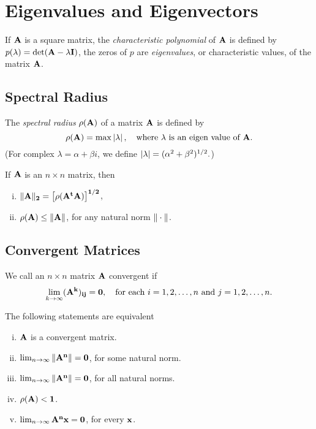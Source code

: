 \section{Eigenvalues and Eigenvectors}
If $\bf A$ is a square matrix, the \emph{characteristic polynomial} of $\bf A$ is defined by $p(\lambda)=\det(\bf A-\lambda I)$, the zeros of $p$ are \emph{eigenvalues}, or characteristic values, of the matrix $\bf A$.

\subsection{Spectral Radius}
\begin{defn}
The \emph{spectral radius} $\rho(\bf A)$ of a matrix $\bf A$ is defined by
\[
\rho(\bf A)=\max\left|\lambda\right|,\quad\text{where $\lambda$ is an eigen value of $\bf A$.}
\]
(For complex $\lambda=\alpha+\beta i$, we define $\left|\lambda\right|=(\alpha^2+\beta^2)^{1/2}.$)
\end{defn}

\begin{theo}
If $\bf A$ is an $n\times n$ matrix, then
\begin{enumerate}[(i)]
    \item $\|\bf A\|_2=\left[\rho(A^tA)\right]^{1/2}$,
    \item $\rho(\bf A)\leq\|\bf A\|$, for any natural norm $\|\cdot\|$.
\end{enumerate}
\end{theo}

\subsection{Convergent Matrices}
\begin{defn}[Convergent]
We call an $n\times n$ matrix $\bf A$  convergent if
\[
\lim_{k\to\infty}(\bf A^k)_{ij}=0,\quad\text{for each $i=1,2,\ldots,n$ and $j=1,2,\ldots,n$.}
\]
\end{defn}

\begin{theo}
The following statements are equivalent
\begin{enumerate}[(i)]
    \item $\bf A$ is a convergent matrix.
    \item $\lim_{n\to\infty}\|\bf A^n\|=0$, for some natural norm.
    \item $\lim_{n\to\infty}\|\bf A^n\|=0$, for all natural norms.
    \item $\rho(\bf A)<1$.
    \item $\lim_{n\to\infty}\bf A^n\bf x=\bf 0$, for every $\bf x$.
\end{enumerate}
\end{theo}

